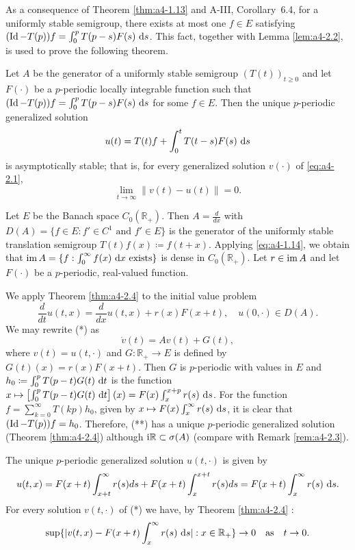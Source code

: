 
As a consequence of Theorem \ref{thm:a4-1.13}  and A-III, Corollary~6.4, for a uniformly stable semigroup, there exists at most one $f \in E$ satisfying $(\operatorname{Id}-T(p))f = \int_{0}^{p} T(p-s)F(s) \,\mathop{}\!\mathrm{d}{s}$. 
This fact, together with Lemma \ref{lem:a4-2.2}, is used to prove the following theorem.


\begin{theorem}\label{thm:a4-2.4}
Let $A$ be the generator of a uniformly stable semigroup $(T(t))_{t \geq 0}$ and let $F(\cdot)$ be a $p$-periodic locally integrable function such that $(\operatorname{Id} - T(p))f = \int_{0}^{p} T(p-s)F(s) \,\mathop{}\!\mathrm{d}{s}$ for some $f \in E$. 
Then the unique $p$-periodic generalized solution
\[
u(t) = T(t)f + \int_{0}^{t} T(t-s)F(s) \,\mathop{}\!\mathrm{d}{s}
\]
is asymptotically stable; that is, for every generalized solution $v(\cdot)$ of \eqref{eq:a4-2.1}, 
\[
\lim_{t \to \infty} \|v(t) - u(t)\| = 0.
\]
\end{theorem}

\begin{example}\label{ex:a4-2.5}
Let $E$ be the Banach space $C_{0}(\mathbb{R}_{+})$. 
Then $A = \frac{d}{dx}$ with $D(A) = \{f \in E: f' \in C^{1} \text{ and } f' \in E\}$ is the generator of the uniformly stable translation semigroup $T(t)f(x) \coloneqq f(t+x)$. 
Applying \eqref{eq:a4-1.14}, we obtain that $\mathop{}\!\mathrm{im}\, A = \{f : \int_{0}^{\infty} f(x) \,\mathop{}\!\mathrm{d}{x} \text{ exists}\}$ is dense in $C_{0}(\mathbb{R}_{+})$. 
Let $r \in \mathop{}\!\mathrm{im}\, A$ and let $F(\cdot)$ be a $p$-periodic, real-valued function.


We apply Theorem \ref{thm:a4-2.4}  to the initial value problem
\begin{equation}
 \frac{d}{dt} u(t,x) = \frac{d}{dx}u(t,x) + r(x)F(x+t), \quad u(0,\cdot) \in D(A). 
 \tag{*}
\end{equation}
We may rewrite (*) as
\begin{equation}
\dot{v}(t) = Av(t) + G(t), \tag{**}
\end{equation}
where $v(t) = u(t,\cdot)$ and $G : \mathbb{R}_{+} \to E$ is defined by $G(t)(x) = r(x)F(x+t)$.
Then $G$ is $p$-periodic with values in $E$ and $h_{0} \coloneqq \int_{0}^{p} T(p-t)G(t) \,\mathop{}\!\mathrm{d}{t}$ is the function $x \mapsto \left[\int_{0}^{p} T(p-t)G(t) \,\mathop{}\!\mathrm{d}{t}\right](x) = F(x)\int_{x}^{x+p} r(s) \,\mathop{}\!\mathrm{d}{s}$. 
For the function $f = \sum_{k=0}^{\infty} T(kp)h_{0}$, given by $x \mapsto F(x)\int_{x}^{\infty} r(s) \,\mathop{}\!\mathrm{d}{s}$, it is clear that $(\operatorname{Id} - T(p))f = h_{0}$. 
Therefore, (**) has a unique $p$-periodic generalized solution (Theorem \ref{thm:a4-2.4}) although $\mathrm{i} \mathbb{R} \subset \sigma(A)$ (compare with Remark \ref{rem:a4-2.3}).


The unique $p$-periodic generalized solution $u(t,\cdot)$ is given by 
\[
u(t,x) = F(x+t)\int_{x+t}^{\infty} r(s)ds + F(x+t)\int_{x}^{x+t} r(s)ds = F(x+t)\int_{x}^{\infty} r(s)\,\mathop{}\!\mathrm{d}{s}.
\]
For every solution $v(t,\cdot)$ of (*) we have, by Theorem \ref{thm:a4-2.4} :
\[
\sup\{|v(t,x) - F(x+t)\int_{x}^{\infty} r(s) \,\mathop{}\!\mathrm{d}{s}| : x \in \mathbb{R}_{+}\} \to 0 \quad \text{as} \quad t \to 0.
\]
\end{example}


